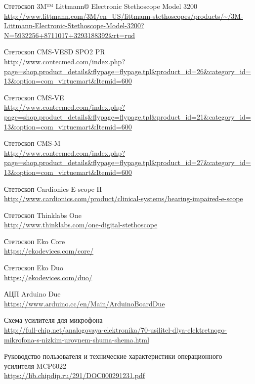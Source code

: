 \documentclass[../main.tex]{subfiles}
\begin{document}
\renewcommand\refname{Список использованных источников}
% 
\begin{thebibliography}{}

Стетоскоп 3M™ Littmann® Electronic Stethoscope Model 3200\\
\url{http://www.littmann.com/3M/en_US/littmann-stethoscopes/products/~/3M-Littmann-Electronic-Stethoscope-Model-3200?N=5932256+8711017+3293188392&rt=rud}

Стетоскоп CMS-VESD SPO2 PR\\
\url{http://www.contecmed.com/index.php?page=shop.product_details&flypage=flypage.tpl&product_id=26&category_id=13&option=com_virtuemart&Itemid=600}

Стетоскоп CMS-VE\\
\url{http://www.contecmed.com/index.php?page=shop.product_details&flypage=flypage.tpl&product_id=21&category_id=13&option=com_virtuemart&Itemid=600}

Стетоскоп CMS-M\\
\url{http://www.contecmed.com/index.php?page=shop.product_details&flypage=flypage.tpl&product_id=27&category_id=13&option=com_virtuemart&Itemid=600}

Стетоскоп Cardionics E-scope II\\
\url{http://www.cardionics.com/product/clinical-systems/hearing-impaired-e-scope}

Стетоскоп Thinklabs One\\
\url{http://www.thinklabs.com/one-digital-stethoscope}

Стетоскоп Eko Core\\
\url{https://ekodevices.com/core/}

Стетоскоп Eko Duo\\
\url{https://ekodevices.com/duo/}

АЦП Arduino Due\\
\url{https://www.arduino.cc/en/Main/ArduinoBoardDue}

Схема усилителя для микрофона\\
\url{http://full-chip.net/analogovaya-elektronika/70-usilitel-dlya-elektretnogo-mikrofona-s-nizkim-urovnem-shuma-shema.html}

Руководство пользователя и технические характеристики операционного усилителя MCP6022\\
\url{https://lib.chipdip.ru/291/DOC000291231.pdf}


\end{thebibliography}
\end{document}
